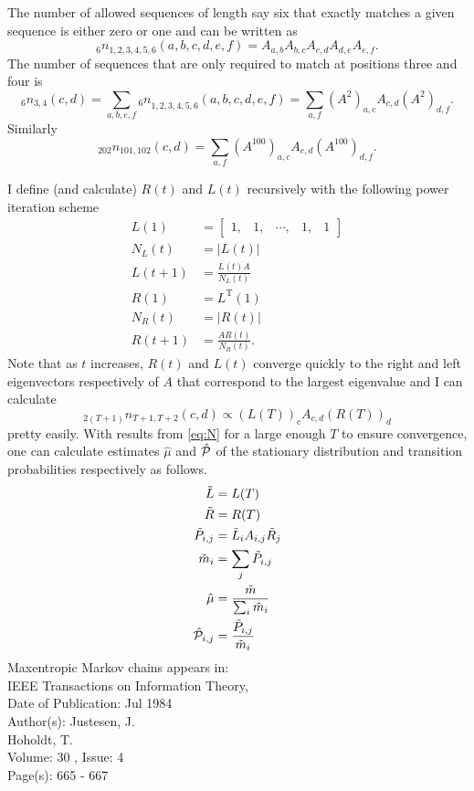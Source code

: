 \documentclass[12pt]{article} \usepackage{amsmath,amsfonts}
\newcommand{\T}{{\cal P}}
\begin{document}
The number of allowed sequences of length say six that exactly matches
a given sequence is either zero or one and can be written as
\begin{equation*}
  _6n_{1,2,3,4,5,6}(a,b,c,d,e,f) = A_{a,b}A_{b,c}A_{c,d}A_{d,e}A_{e,f}.
\end{equation*}
The number of sequences that are only required to match at positions
three and four is
\begin{equation*}
 _6n_{3,4}(c,d) =  \sum_{a,b,e,f} {_6n}_{1,2,3,4,5,6}(a,b,c,d,e,f) =
 \sum_{a,f} \left(A^2\right)_{a,c} A_{c,d} \left(A^2\right)_{d,f}.
\end{equation*}
Similarly
\begin{equation*}
 _{202}n_{101,102}(c,d) = \sum_{a,f} \left(A^{100}\right)_{a,c} A_{c,d} \left(A^{100}\right)_{d,f}.
\end{equation*}

I define (and calculate) $R(t)$ and $L(t)$ recursively with the
following power iteration scheme
\begin{align*}
  L(1) &= \begin{bmatrix} 1,&1,&\cdots,&1,&1\end{bmatrix} \\
  N_L(t) &= \left| L(t) \right| \\
  L(t+1) &= \frac{L(t) A}{N_L(t)} \\
  R(1) &= L^{\text{T}}(1) \\
  N_R(t) &= \left| R(t) \right| \\
  R(t+1) &= \frac{A R(t)}{N_R(t)}.
\end{align*}
Note that as $t$ increases, $R(t)$ and $L(t)$ converge quickly to the
right and left eigenvectors respectively of $A$ that correspond to the
largest eigenvalue and I can calculate
\begin{equation}
  \label{eq:N}
   _{2(T+1)}n_{T+1,T+2}(c,d) \propto \left(L(T)\right)_c  A_{c,d}
   \left(R(T)\right)_d
\end{equation}
pretty easily.  With results from \eqref{eq:N} for a large enough $T$
to ensure convergence, one can calculate estimates $\hat \mu$ and
$\hat \T$ of the stationary distribution and transition probabilities
respectively as follows.
\begin{align*}
  \tilde L &= L(T) \\
  \tilde R &= R(T) \\
  \tilde P_{i,j} &= \tilde L_i A_{i,j} \tilde R_j \\
  \tilde m_i &= \sum_j \tilde P_{i,j} \\
  \hat \mu &= \frac{\tilde m}{\sum_i \tilde m_i} \\
  \hat \T_{i,j} &= \frac{\tilde P_{i,j}}{\tilde m_i}
\end{align*}
Maxentropic Markov chains appears in:\\
IEEE Transactions on Information Theory, \\
Date of Publication: Jul 1984\\
Author(s): Justesen, J.\\
Hoholdt, T.\\
Volume: 30 , Issue: 4\\
Page(s): 665 - 667
\end{document}
